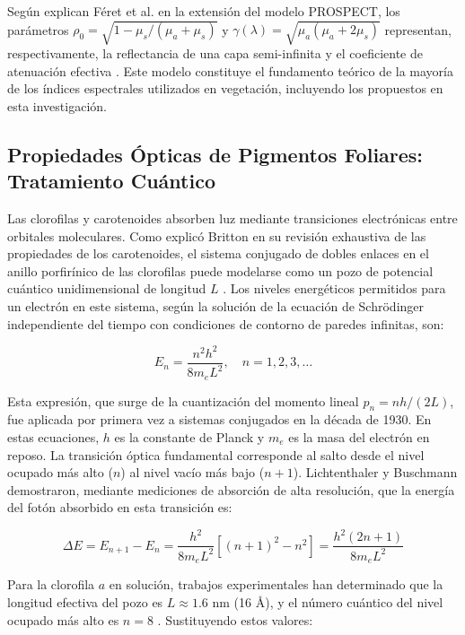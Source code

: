 \documentclass[12pt, a4paper]{article}
\begin{document}
	Según explican Féret et al. en la extensión del modelo PROSPECT, los parámetros $\rho_0 = \sqrt{1 - \mu_s/(\mu_a + \mu_s)}$ y $\gamma(\lambda) = \sqrt{\mu_a(\mu_a + 2\mu_s)}$ representan, respectivamente, la reflectancia de una capa semi-infinita y el coeficiente de atenuación efectiva \parencite{feret2008}. Este modelo constituye el fundamento teórico de la mayoría de los índices espectrales utilizados en vegetación, incluyendo los propuestos en esta investigación.
	
	\subsection{Propiedades Ópticas de Pigmentos Foliares: Tratamiento Cuántico}
	
	Las clorofilas y carotenoides absorben luz mediante transiciones electrónicas entre orbitales moleculares. Como explicó Britton en su revisión exhaustiva de las propiedades de los carotenoides, el sistema conjugado de dobles enlaces en el anillo porfirínico de las clorofilas puede modelarse como un pozo de potencial cuántico unidimensional de longitud $L$ \parencite{Britton1995}. Los niveles energéticos permitidos para un electrón en este sistema, según la solución de la ecuación de Schrödinger independiente del tiempo con condiciones de contorno de paredes infinitas, son:
	
	\begin{equation}
		E_n = \frac{n^2 h^2}{8 m_e L^2}, \quad n = 1, 2, 3, \ldots
		\label{eq:niveles_energeticos_pozo}
	\end{equation}
	
	Esta expresión, que surge de la cuantización del momento lineal $p_n = nh/(2L)$, fue aplicada por primera vez a sistemas conjugados en la década de 1930. En estas ecuaciones, $h$ es la constante de Planck y $m_e$ es la masa del electrón en reposo. La transición óptica fundamental corresponde al salto desde el nivel ocupado más alto ($n$) al nivel vacío más bajo ($n+1$). Lichtenthaler y Buschmann demostraron, mediante mediciones de absorción de alta resolución, que la energía del fotón absorbido en esta transición es:
	
	\begin{equation}
		\Delta E = E_{n+1} - E_n = \frac{h^2}{8 m_e L^2} \left[ (n+1)^2 - n^2 \right] = \frac{h^2(2n+1)}{8 m_e L^2}
		\label{eq:transicion_electronica}
	\end{equation}
	
	Para la clorofila $a$ en solución, trabajos experimentales han determinado que la longitud efectiva del pozo es $L \approx 1.6$ nm (16 Å), y el número cuántico del nivel ocupado más alto es $n = 8$ \parencite{lichtenthaler2001}. Sustituyendo estos valores:
	
\end{document}
